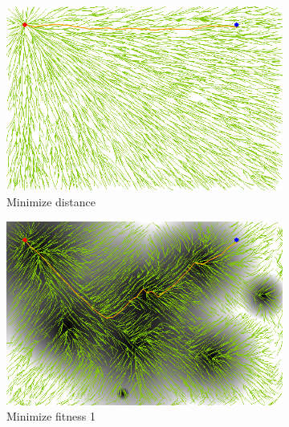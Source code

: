 \documentclass[conference]{IEEEtran}
\begin{document}
\begin{figure}
	\centering
	\begin{subfigure}[b]{0.45\linewidth}
		\centering
		\includegraphics[width=\textwidth]{fig/sim2-2obj/MORRTstar00-0.png}
		\caption{Minimize distance}
		\label{fig:sim:norm:distance}
	\end{subfigure}
	\begin{subfigure}[b]{0.45\linewidth}
		\centering
		\includegraphics[width=\textwidth]{fig/sim2-2obj/MORRTstar00-1.png}
		\caption{Minimize fitness 1}
		\label{fig:sim:norm:fitness1}
	\end{subfigure}  \\
	\begin{subfigure}[b]{0.45\linewidth}
		\centering

\end{subfigure}
\end{figure}
\end{document}
